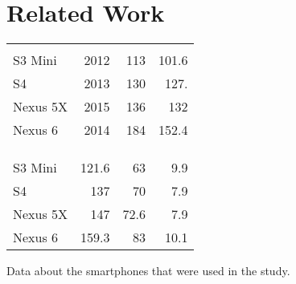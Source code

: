 \section{Related Work}
\label{sec:relw}
\begin{margintable}
	\vspace{-1.0cm}
	\centering
	\begin{tabularx}{1.03\marginparwidth}{Xd{2.1}d{2.1}d{3.1}}
		\toprule
		&
		&    
		 &
		 \\
		\\
		\\
		\midrule
		S3 Mini  		& 2012 & 113  & 101.6\\
		S4 				& 2013 & 130  & 127.\\
		Nexus 5X 		& 2015 & 136  & 132\\
		Nexus 6 		& 2014 & 184  & 152.4\\ 
		
		
		\bottomrule
		
		& &
		 &
		 \\ 
		\\
		\\
		\midrule
		S3 Mini  		& 121.6 & 63  & 9.9 \\
		S4 				& 137  & 70  & 7.9 \\
		Nexus 5X 		& 147  & 72.6 & 7.9 \\
		Nexus 6 		& 159.3 & 83  & 10.1 \\
		
		\bottomrule
	\end{tabularx}%
	\caption[Smartphone data]{\small Data about the smartphones that were used in the study.}
	\label{tab:devices}
\end{margintable}
